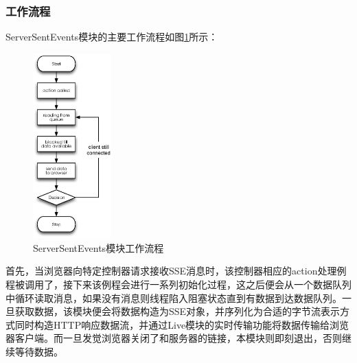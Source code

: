 \subsubsection{工作流程}
ServerSentEvents模块的主要工作流程如图\ref{fig-sses-process}所示：

\begin{figure}[h]
\centering
\includegraphics[width=0.27\textwidth]{images/detail/sse_process.eps}
\caption{ServerSentEvents模块工作流程}
\label{fig-sses-process}
\end{figure}

首先，当浏览器向特定控制器请求接收SSE消息时，该控制器相应的action处理例程被调用了，接下来该例程会进行一系列初始化过程，这之后便会从一个数据队列中循环读取消息，如果没有消息则线程陷入阻塞状态直到有数据到达数据队列。一旦获取数据，该模块便会将数据构造为SSE对象，并序列化为合适的字节流表示方式同时构造HTTP响应数据流，并通过Live模块的实时传输功能将数据传输给浏览器客户端。而一旦发觉浏览器关闭了和服务器的链接，本模块则即刻退出，否则继续等待数据。

